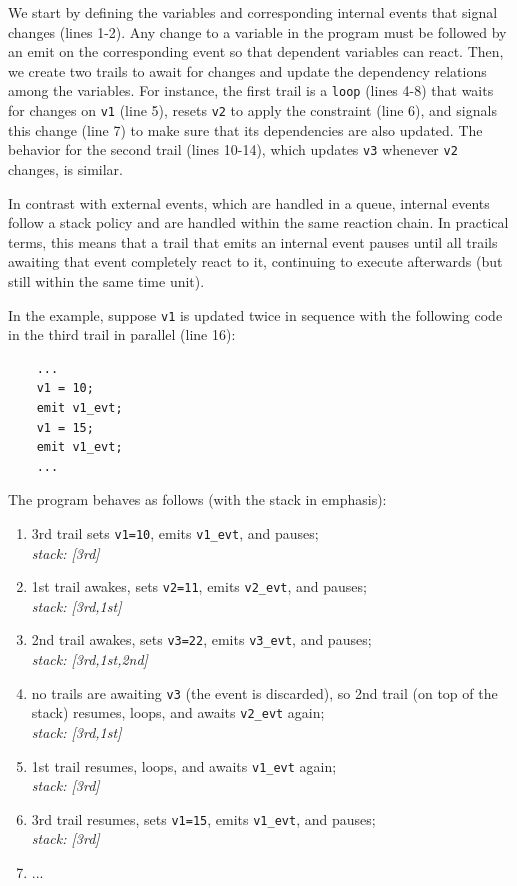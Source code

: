 \documentclass{sigplan-proc}
\newcommand{\2}{\;\;}
\newcommand{\5}{\;\;\;\;\;}
\newcommand{\code}[1] {{\small{\texttt{#1}}}}
\begin{document}
We start by defining the variables and corresponding internal events that 
signal changes (lines 1-2).
Any change to a variable in the program must be followed by an emit on the 
corresponding event so that dependent variables can react.
Then, we create two trails to await for changes and update the dependency 
relations among the variables.
For instance, the first trail is a \code{loop} (lines 4-8) that waits for 
changes on \code{v1} (line 5), resets \code{v2} to apply the constraint (line 
6), and signals this change (line 7) to make sure that its dependencies are 
also updated.
The behavior for the second trail (lines 10-14), which updates \code{v3} 
whenever \code{v2} changes, is similar.

In contrast with external events, which are handled in a queue, internal events 
follow a stack policy and are handled within the same reaction chain.
In practical terms, this means that a trail that emits an internal event pauses 
until all trails awaiting that event completely react to it, continuing to 
execute afterwards (but still within the same time unit).

In the example, suppose \code{v1} is updated twice in sequence with the 
following code in the third trail in parallel (line 16):
{\small
\begin{verbatim}
    ...
    v1 = 10;
    emit v1_evt;
    v1 = 15;
    emit v1_evt;
    ...
\end{verbatim}
}
The program behaves as follows (with the stack in emphasis):

{\small
\begin{enumerate}
\setlength{\itemsep}{0pt}
\item 3rd trail sets \code{v1=10}, emits \code{v1\_evt}, and pauses;\\
    \emph{stack: [3rd]}
\item 1st trail awakes, sets \code{v2=11}, emits \code{v2\_evt}, and pauses;\\
    \emph{stack: [3rd,1st]}
\item 2nd trail awakes, sets \code{v3=22}, emits \code{v3\_evt}, and pauses;\\
    \emph{stack: [3rd,1st,2nd]}
\item no trails are awaiting \code{v3} (the event is discarded), so 2nd trail 
    (on top of the stack) resumes, loops, and awaits \code{v2\_evt} again;\\
    \emph{stack: [3rd,1st]}
\item 1st trail resumes, loops, and awaits \code{v1\_evt} again;\\
    \emph{stack: [3rd]}
\item 3rd trail resumes, sets \code{v1=15}, emits \code{v1\_evt}, and pauses;\\
    \emph{stack: [3rd]}
\item ...
\end{enumerate}
}
\end{document}
